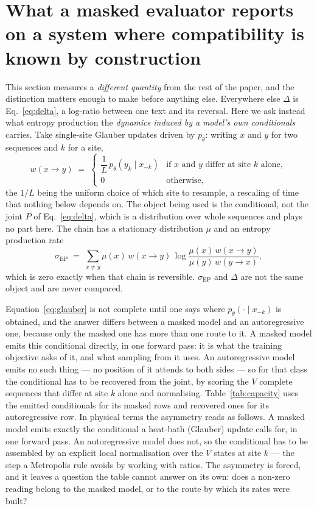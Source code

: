 \documentclass[11pt]{article}
\newcommand{\sigEP}{\sigma_{\mathrm{EP}}}
\begin{document}
\section{What a masked evaluator reports on a system where compatibility
is known by construction}
\label{sec:toy}
This section measures a \emph{different quantity} from the rest of the paper,
and the distinction matters enough to make before anything else.  Everywhere
else $\Delta$ is Eq.~\eqref{eq:delta}, a log-ratio between one text and its
reversal.  Here we ask instead what entropy production the \emph{dynamics
induced by a model's own conditionals} carries.  Take single-site Glauber
updates driven by $p_\theta$: writing $x$ and $y$ for two sequences and $k$
for a site,
\begin{equation}
w(x \to y) \;=\;
  \begin{cases}
    \dfrac{1}{L}\, p_\theta\!\left(y_k \mid x_{-k}\right)
      & \text{if $x$ and $y$ differ at site $k$ alone},\\[1.8ex]
    0 & \text{otherwise},
  \end{cases}
\label{eq:glauber}
\end{equation}
the $1/L$ being the uniform choice of which site to resample, a rescaling of
time that nothing below depends on.  The object being used is the
conditional, not the joint $P$ of Eq.~\eqref{eq:delta}, which is a
distribution over whole sequences and plays no part here.  The chain has a
stationary distribution $\mu$ and an entropy production rate
\begin{equation}
\sigEP \;=\; \sum_{x \neq y} \mu(x)\, w(x \to y)\,
    \log \frac{\mu(x)\, w(x \to y)}{\mu(y)\, w(y \to x)} ,
\label{eq:sigep}
\end{equation}
which is zero exactly when that chain is reversible.  $\sigEP$ and $\Delta$
are not the same object and are never compared.

Equation~\eqref{eq:glauber} is not complete until one says where
$p_\theta(\cdot \mid x_{-k})$ is obtained, and the answer differs between a
masked model and an autoregressive one, because only the masked one has more
than one route to it.  A masked model emits this conditional directly, in one
forward pass: it is what the training objective asks of it, and what sampling
from it uses.  An autoregressive model emits no such thing --- no position of
it attends to both sides --- so for that class the conditional has to be
recovered from the joint, by scoring the $V$ complete sequences that differ
at site $k$ alone and normalising.  Table~\ref{tab:capacity} uses the
emitted conditionals for its masked rows and recovered ones for its
autoregressive row.  In physical terms the asymmetry reads as follows.  A
masked model emits exactly the conditional a heat-bath (Glauber) update calls
for, in one forward pass.  An autoregressive model does not, so the
conditional has to be assembled by an explicit local normalisation over the
$V$ states at site $k$ --- the step a Metropolis rule avoids by working with
ratios.  The asymmetry is forced, and it leaves a question the table cannot
answer on its own: does a non-zero reading belong to the masked model, or to
the route by which its rates were built?
\end{document}
